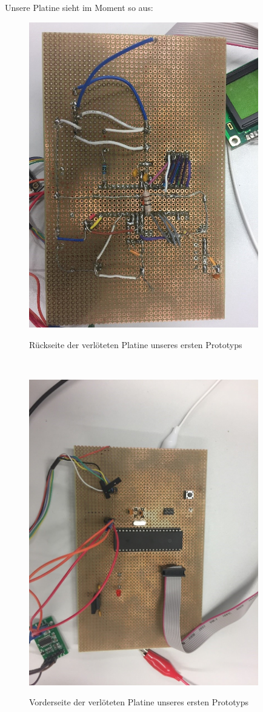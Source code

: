 \noindent
Unsere Platine sieht im Moment so aus:
\begin{figure}[ht]
    \center
    \includegraphics[width=10cm]{Bilder/schaltplan-2.jpg}\\
    \caption{Rückseite der verlöteten Platine unseres ersten Prototyps}
    \label{fig:schaltplan-rueckseite}
\end{figure}\\
\begin{figure}[ht]
    \center
    \includegraphics[width=10cm]{Bilder/schaltplan-3.jpg}\\
    \caption{Vorderseite der verlöteten Platine unseres ersten Prototyps}
    \label{fig:schaltplan-vorderseite}
\end{figure}\\
